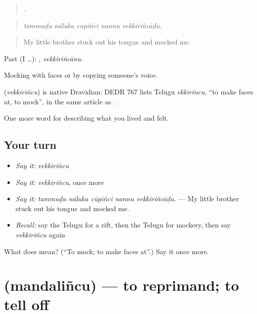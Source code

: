 \begin{quote}
    .
\end{quote}

\begin{quote}
\emph{tammuḍu nāluka cūpiñci nannu vekkiriñcāḍu.}
\end{quote}

\begin{quote}
My little brother stuck out his tongue and mocked me.
\end{quote}

Past (I …): , \emph{vekkiriñcānu}.

Mocking with faces or by copying someone's voice.

\begin{cousinweb}
\textbf{} (\emph{vekkiriñcu}) is native Dravidian: DEDR 767 lists Telugu \emph{ekkirincu}, \textquotedblleft{}to make faces at, to mock\textquotedblright{}, in the same article as .
\end{cousinweb}

\begin{grammarlens}[title={What you've built}]
One more word for describing what you lived and felt.
\end{grammarlens}

\subsection*{Your turn}
\begin{itemize}
\raggedright
  \item \emph{Say it:} \emph{vekkiriñcu}
  \item \emph{Say it:} \emph{vekkiriñcu}, once more
  \item \emph{Say it:} \emph{tammuḍu nāluka cūpiñci nannu vekkiriñcāḍu.} — My little brother stuck out his tongue and mocked me.
  \item \emph{Recall:} say the Telugu for a rift, then the Telugu for mockery, then say \emph{vekkiriñcu} again
\end{itemize}

\begin{tcolorbox}[breakable,colback=teal!4,colframe=teal!35!black,title={Before you move on}]
What does  mean? (\textquotedblleft{}To mock; to make faces at\textquotedblright{}.) Say it once more.
\end{tcolorbox}
\section[\texorpdfstring{\te{మందలించు} (mandaliñcu)}{మందలించు (mandaliñcu)}]{ (mandaliñcu) — to reprimand; to tell off}

